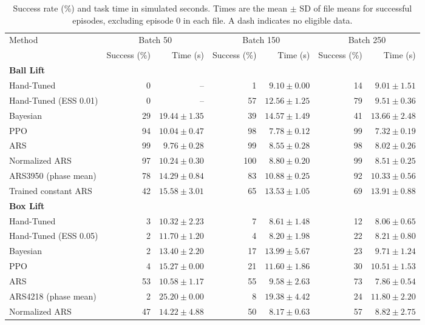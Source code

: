 \begin{table}[t]
\centering\small
\caption{Success rate (\%) and task time in simulated seconds. Times are the mean $\pm$ SD of file means for successful episodes, excluding episode 0 in each file. A dash indicates no eligible data.}
\begin{tabular}{lrrrrrr}
Method & \multicolumn{2}{c}{Batch 50} & \multicolumn{2}{c}{Batch 150} & \multicolumn{2}{c}{Batch 250} \\
 & Success (\%) & Time (s) & Success (\%) & Time (s) & Success (\%) & Time (s) \\
\hline
\multicolumn{7}{l}{\textbf{Ball Lift}} \\
Hand-Tuned & 0 & -- & 1 & $ 9.10 \pm 0.00 $ & 14 & $ 9.01 \pm 1.51 $ \\
Hand-Tuned (ESS 0.01) & 0 & -- & 57 & $ 12.56 \pm 1.25 $ & 79 & $ 9.51 \pm 0.36 $ \\
Bayesian & 29 & $ 19.44 \pm 1.35 $ & 39 & $ 14.57 \pm 1.49 $ & 41 & $ 13.66 \pm 2.48 $ \\
PPO & 94 & $ 10.04 \pm 0.47 $ & 98 & $ 7.78 \pm 0.12 $ & 99 & $ 7.32 \pm 0.19 $ \\
ARS & 99 & $ 9.76 \pm 0.28 $ & 99 & $ 8.55 \pm 0.28 $ & 98 & $ 8.02 \pm 0.26 $ \\
Normalized ARS & 97 & $ 10.24 \pm 0.30 $ & 100 & $ 8.80 \pm 0.20 $ & 99 & $ 8.51 \pm 0.25 $ \\
ARS3950 (phase mean) & 78 & $ 14.29 \pm 0.84 $ & 83 & $ 10.88 \pm 0.25 $ & 92 & $ 10.33 \pm 0.56 $ \\
Trained constant ARS & 42 & $ 15.58 \pm 3.01 $ & 65 & $ 13.53 \pm 1.05 $ & 69 & $ 13.91 \pm 0.88 $ \\
\hline
\multicolumn{7}{l}{\textbf{Box Lift}} \\
Hand-Tuned & 3 & $ 10.32 \pm 2.23 $ & 7 & $ 8.61 \pm 1.48 $ & 12 & $ 8.06 \pm 0.65 $ \\
Hand-Tuned (ESS 0.05) & 2 & $ 11.70 \pm 1.20 $ & 4 & $ 8.20 \pm 1.98 $ & 22 & $ 8.21 \pm 0.80 $ \\
Bayesian & 2 & $ 13.40 \pm 2.20 $ & 17 & $ 13.99 \pm 5.67 $ & 23 & $ 9.71 \pm 1.24 $ \\
PPO & 4 & $ 15.27 \pm 0.00 $ & 21 & $ 11.60 \pm 1.86 $ & 30 & $ 10.51 \pm 1.53 $ \\
ARS & 53 & $ 10.58 \pm 1.17 $ & 55 & $ 9.58 \pm 2.63 $ & 73 & $ 7.86 \pm 0.54 $ \\
ARS4218 (phase mean) & 2 & $ 25.20 \pm 0.00 $ & 8 & $ 19.38 \pm 4.42 $ & 24 & $ 11.80 \pm 2.20 $ \\
Normalized ARS & 47 & $ 14.22 \pm 4.88 $ & 50 & $ 8.17 \pm 0.63 $ & 57 & $ 8.82 \pm 2.75 $ \\

\end{tabular}
\end{table}
